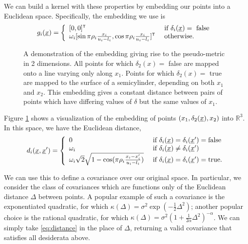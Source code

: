 \documentclass{article}
\newcommand{\vect}[1]{\underline{\smash{#1}}}
\renewcommand{\v}[1]{\vect{#1}}
\newcommand{\reals}{\mathds{R}}
\newcommand{\sX}{\mathcal{X}}
\newcommand{\br}{}%
\newcommand\transpose{{\textrm{\tiny{\sf{T}}}}}
\newcommand{\embeddingletter}{g}
\begin{document}
We can build a kernel with these properties by embedding our points into a Euclidean space.  Specifically, the embedding we use is
%
%
%
\begin{equation}
\embeddingletter_i\br(\v{x}) = \left\{\begin{array}{ll}
[0,0]^\transpose & \textrm{ if } \delta_i(\v{x}) = \textrm{ false }\\
\omega_i [\sin{\pi\rho_i\frac{x_i}{u_i-l_i}}, \cos{\pi\rho_i\frac{x_i}{u_i-l_i}}]^\transpose & \textrm{ otherwise.}\end{array}\right.
\end{equation}
%
\begin{figure}

\caption{A demonstration of the embedding giving rise to the pseudo-metric in 2 dimensions.  All points for which $\delta_2(x) =$ false are mapped onto a line varying only along $x_1$.  Points for which $\delta_2(x) =$ true are mapped to the surface of a semicylinder, depending on both $x_1$ and $x_2$.  This embedding gives a constant distance between pairs of points which have differing values of $\delta$ but the same values of $x_1$.
}
\label{fig:cylinder}
\end{figure}

Figure \ref{fig:cylinder} shows a visualization of the embedding of points $(x_1, \delta_2(\v{x}), x_2)$ into $\reals^3$. 
%
In this space, we have the Euclidean distance,
%
\begin{equation}
d\br_i(\v{x}, \v{x}') = \left\{\begin{array}{ll}
0 & \textrm{ if } \delta_i(\v{x}) = \delta_i(\v{x}') = \textrm{false}\\
\omega_i & \textrm{ if } \delta_i(\v{x}) \neq \delta_i(\v{x}')\\
\omega_i \sqrt{2} \sqrt{1 - \cos(\pi\rho_i \frac{x_i-x_i'}{u_i-l_i})} & \textrm{ if } \delta_i(\v{x}) = \delta_i(\v{x}') = \textrm{true}. \end{array}\right.
\label{eq:distance}
\end{equation}



We can use this to define a covariance over our original space. In particular, we consider the class of covariances which are functions only of the Euclidean distance $\Delta$ between points. A popular example of such a covariance is the exponentiated quadratic, for which $\kappa(\Delta) = \sigma^2 \exp(-\frac{1}{2} \Delta^2)$; another popular choice is the rational quadratic, for which $\kappa(\Delta) = \sigma^2 (1+\frac{1}{2\alpha} \Delta^2)^{-\alpha}$. We can simply take \eqref{eq:distance} in the place of $\Delta$, returning a valid covariance that satisfies all desiderata above. 
\end{document}
